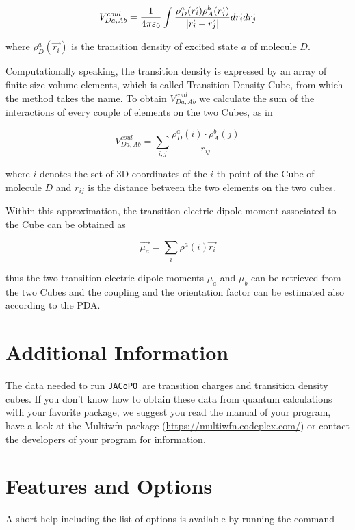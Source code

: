 \documentclass[a4paper]{article}
\newcommand{\jacopo}{\texttt{JACoPO}}
\DeclarePairedDelimiter\norm{\lvert}{\rvert}
\begin{document}
\begin{equation}
 V^{coul}_{Da,Ab} = \frac{1}{4\pi\varepsilon_0} \int \frac{\rho_D^a(\vec{r_i})\rho_A^b(\vec{r_j})}{\norm{\vec{r_i} - \vec{r_j}}} d\vec{r_i} d\vec{r_j}
 \label{eq:TDC}
\end{equation}

where $\rho_D^a(\vec{r_i})$ is the transition density of excited state $a$ of molecule $D$.

Computationally speaking, the transition density is expressed by an array of finite-size volume elements, which is called Transition Density Cube, from which the method takes the name. To obtain $V^{coul}_{Da,Ab}$ we calculate the sum of the interactions of every couple of elements on the two Cubes, as in

\begin{equation}
 V^{coul}_{Da,Ab} = \sum_{i,j} \frac{\rho_D^a(i)\cdot \rho_A^b(j)}{r_{ij}}
 \label{eq:TDC1}
\end{equation}

where $i$ denotes the set of 3D coordinates of the $i$-th point of the Cube of molecule $D$ and $r_{ij}$ is the distance between the two elements on the two cubes.

Within this approximation, the transition electric dipole moment associated to the Cube can be obtained as

\begin{equation}
 \vec{\mu_a} = \sum_i \rho^a(i) \vec{r_i}
 \label{eq:mu_TDC}
\end{equation}

thus the two transition electric dipole moments $\mu_a$ and $\mu_b$ can be retrieved from the two Cubes and the coupling and the orientation factor can be estimated also according to the PDA.

\section{Additional Information}
The data needed to run \jacopo\ are transition charges and transition density cubes. If you don't know how to obtain these data from quantum calculations with your favorite package, we suggest you read the manual of your program, have a look at the Multiwfn package (\url{https://multiwfn.codeplex.com/}) or contact the developers of your program for information.

\section{Features and Options}
\label{Options}
A short help including the list of options is available by running the command
\end{document}
